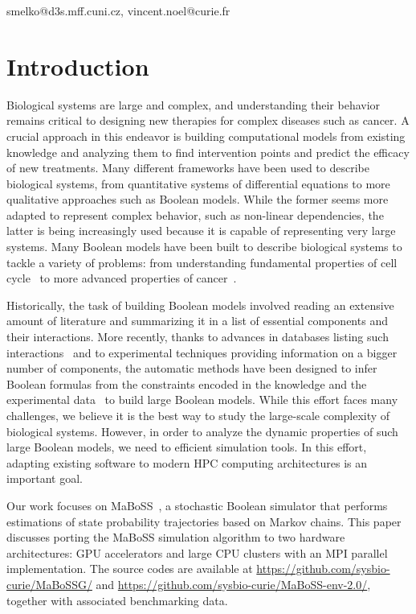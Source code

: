 \documentclass[times, twoside]{zHenriquesLab-StyleBioRxiv}
\begin{document}
\begin{corrauthor}
smelko@d3s.mff.cuni.cz, vincent.noel@curie.fr
\end{corrauthor}
\section*{Introduction}
Biological systems are large and complex, and understanding their behavior remains critical to designing new therapies for complex diseases such as cancer. A crucial approach in this endeavor is building computational models from existing knowledge and analyzing them to find intervention points and predict the efficacy of new treatments.
Many different frameworks have been used to describe biological systems, from quantitative systems of differential equations to more qualitative approaches such as Boolean models. While the former seems more adapted to represent complex behavior, such as non-linear dependencies, the latter is being increasingly used because it is capable of representing very large systems.
Many Boolean models have been built to describe biological systems to tackle a variety of problems: from understanding fundamental properties of cell cycle~\cite{faure2006cellcycle,sizek2019boolean} to more advanced properties of cancer~\cite{fumia_carcinogenesis_2013, montagud2022prostate}.

Historically, the task of building Boolean models involved reading an extensive amount of literature and summarizing it in a list of essential components and their interactions. More recently, thanks to advances in databases listing such interactions~\cite{licata2020signor,turei2016omnipath} and to experimental techniques providing information on a bigger number of components, the automatic methods have been designed to infer Boolean formulas from the constraints encoded in the knowledge and the experimental data~\cite{10.1093/bioinformatics/btaa484,chevalier2020synthesis,benevs2023boolean} to build large Boolean models. While this effort faces many challenges, we believe it is the best way to study the large-scale complexity of biological systems. However, in order to analyze the dynamic properties of such large Boolean models, we need to efficient simulation tools. In this effort, adapting existing software to modern HPC computing architectures is an important goal. 

Our work focuses on MaBoSS~\cite{stoll2012continuous, stoll2017maboss}, a stochastic Boolean simulator that performs estimations of state probability trajectories based on Markov chains. 
This paper discusses porting the MaBoSS simulation algorithm to two hardware architectures: GPU accelerators and large CPU clusters with an MPI parallel implementation. The source codes are available at \url{https://github.com/sysbio-curie/MaBoSSG/} and \url{https://github.com/sysbio-curie/MaBoSS-env-2.0/}, together with associated benchmarking data.
\end{document}
